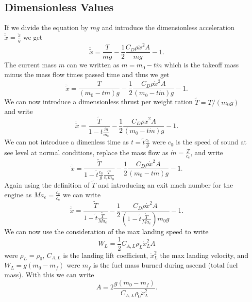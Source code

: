 \subsection{Dimensionless Values}
If we divide the equation by $m g$ and introduce the dimensionless acceleration $\ddot{\tilde{x}} = \frac{\ddot{x}}{g}$ we get
\begin{equation}
	\ddot{\tilde{x}} = \frac{T}{m g} - \frac{1}{2}\frac{C_D \rho \dot{x}^2 A}{m g} - 1.
\end{equation}
The current mass $m$ can we written as $m = m_0 - t \dot{m}$ which is the takeoff mass  minus the mass flow times passed time and thus we get
\begin{equation}
	\ddot{\tilde{x}} = \frac{T}{(m_0 - t \dot{m}) g} - \frac{1}{2}\frac{C_D \rho \dot{x}^2 A}{(m_0 - t \dot{m}) g} - 1.
\end{equation}
We can now introduce a dimensionless thrust per weight ration $\tilde{T} = T / (m_0 g)$ and write
\begin{equation}
	\ddot{\tilde{x}} = \frac{\tilde{T}}{1 - t \frac{\dot{m}}{m_0}} - \frac{1}{2}\frac{C_D \rho \dot{x}^2 A}{(m_0 - t \dot{m}) g} - 1.
\end{equation}
We can not introduce a dimenless time as $t = \tilde{t} \frac{c_0}{g}$ were $c_0$ is the speed of sound at see level at normal conditions, replace the mass flow as $\dot{m} = \frac{T}{c_e}$, and write
\begin{equation}
	\ddot{\tilde{x}} = \frac{\tilde{T}}{1 - \tilde{t} \frac{c_0}{g} \frac{T}{c_e m_0}} - \frac{1}{2}\frac{C_D \rho \dot{x}^2 A}{(m_0 - t \dot{m}) g} - 1.
\end{equation}
Again using the definition of $\tilde{T}$ and introducing an exit mach number for the engine as $Ma_{e} = \frac{c_e}{c_e}$ we can write 
\begin{equation}
	\ddot{\tilde{x}} = \frac{\tilde{T}}{1 - \tilde{t} \frac{\tilde{T}}{Ma_e}} - \frac{1}{2}\frac{C_D \rho \dot{x}^2 A}{\left(1 - \tilde{t} \frac{\tilde{T}}{Ma_e}\right) m_0 g} - 1.
\end{equation}
We can now use the consideration of the max landing speed to write
\begin{equation}
	W_L = \frac{1}{2} C_{A, L} \rho_L \dot{x}_L^2 A 
\end{equation}
were $\rho_L = \rho_0$, $C_{A, L}$ is the landing lift coefficient, $\dot{x}_L^2$ the max landing velocity, and $W_L = g(m_0 - m_f)$ were $m_f$ is the fuel mass burned during ascend (total fuel mass). With this we can write
\begin{equation}
	A = 2 \frac{g(m_0 - m_f)}{C_{A, L} \rho_0 \dot{x}_L^2}.
\end{equation}
